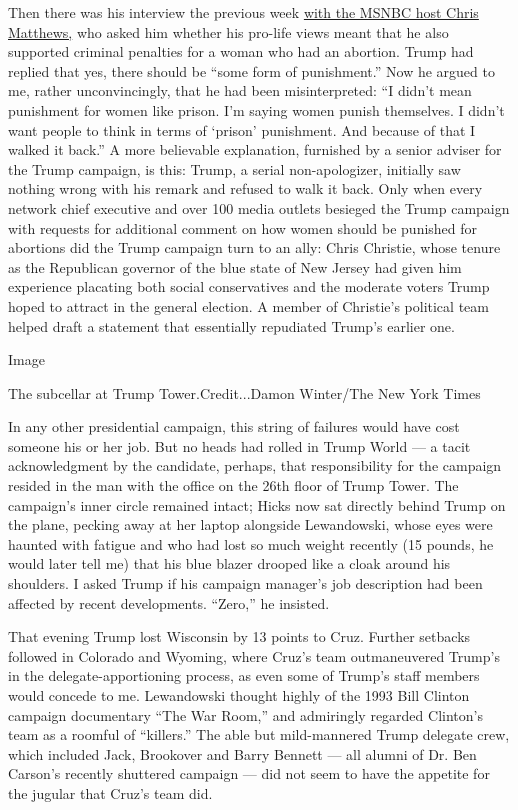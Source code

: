 Then there was his interview the previous week
\href{http://www.msnbc.com/hardball/watch/trump-s-hazy-stance-on-abortion-punishment-655457859717}{with
the MSNBC host Chris Matthews,} who asked him whether his pro-life views
meant that he also supported criminal penalties for a woman who had an
abortion. Trump had replied that yes, there should be ``some form of
punishment.'' Now he argued to me, rather unconvincingly, that he had
been misinterpreted: ``I didn't mean punishment for women like prison.
I'm saying women punish themselves. I didn't want people to think in
terms of `prison' punishment. And because of that I walked it back.'' A
more believable explanation, furnished by a senior adviser for the Trump
campaign, is this: Trump, a serial non-apologizer, initially saw nothing
wrong with his remark and refused to walk it back. Only when every
network chief executive and over 100 media outlets besieged the Trump
campaign with requests for additional comment on how women should be
punished for abortions did the Trump campaign turn to an ally: Chris
Christie, whose tenure as the Republican governor of the blue state of
New Jersey had given him experience placating both social conservatives
and the moderate voters Trump hoped to attract in the general election.
A member of Christie's political team helped draft a statement that
essentially repudiated Trump's earlier one.

Image

The subcellar at Trump Tower.Credit...Damon Winter/The New York Times

In any other presidential campaign, this string of failures would have
cost someone his or her job. But no heads had rolled in Trump World ---
a tacit acknowledgment by the candidate, perhaps, that responsibility
for the campaign resided in the man with the office on the 26th floor of
Trump Tower. The campaign's inner circle remained intact; Hicks now sat
directly behind Trump on the plane, pecking away at her laptop alongside
Lewandowski, whose eyes were haunted with fatigue and who had lost so
much weight recently (15 pounds, he would later tell me) that his blue
blazer drooped like a cloak around his shoulders. I asked Trump if his
campaign manager's job description had been affected by recent
developments. ``Zero,'' he insisted.

That evening Trump lost Wisconsin by 13 points to Cruz. Further setbacks
followed in Colorado and Wyoming, where Cruz's team outmaneuvered
Trump's in the delegate-apportioning process, as even some of Trump's
staff members would concede to me. Lewandowski thought highly of the
1993 Bill Clinton campaign documentary ``The War Room,'' and admiringly
regarded Clinton's team as a roomful of ``killers.'' The able but
mild-mannered Trump delegate crew, which included Jack, Brookover and
Barry Bennett --- all alumni of Dr. Ben Carson's recently shuttered
campaign --- did not seem to have the appetite for the jugular that
Cruz's team did.

